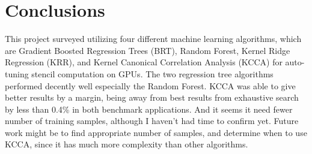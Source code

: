 \section{Conclusions}

This project surveyed utilizing four different machine learning algorithms, which are Gradient Boosted Regression Trees (BRT), Random Forest, Kernel Ridge Regression (KRR), and Kernel Canonical Correlation Analysis (KCCA) for auto-tuning stencil computation on GPUs. The two regression tree algorithms performed decently well especially the Random Forest. KCCA was able to give better results by a margin, being away from best results from exhaustive search by less than 0.4\% in both benchmark applications. And it seems it need fewer number of training samples, although I haven't had time to confirm yet. Future work might be to find appropriate number of samples, and determine when to use KCCA, since it has much more complexity than other algorithms.
